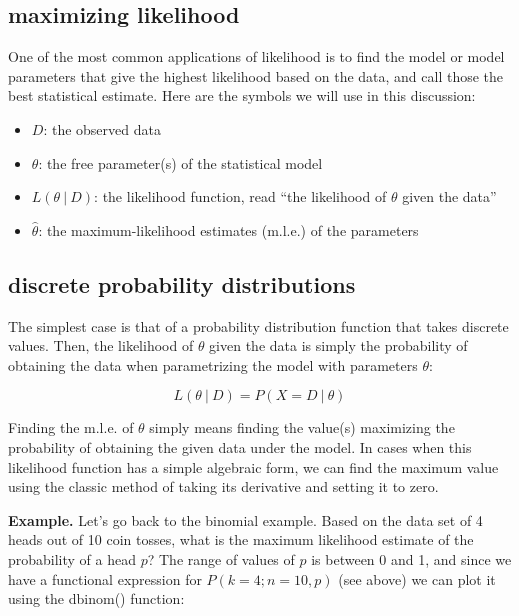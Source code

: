 \documentclass[
  letterpaper,
  DIV=11,
  numbers=noendperiod]{scrreprt}
\providecommand{\tightlist}{%
  \setlength{\itemsep}{0pt}\setlength{\parskip}{0pt}}\usepackage{longtable,booktabs,array}
\begin{document}
\hypertarget{maximizing-likelihood}{%
\subsection{maximizing likelihood}\label{maximizing-likelihood}}

One of the most common applications of likelihood is to find the model
or model parameters that give the highest likelihood based on the data,
and call those the best statistical estimate. Here are the symbols we
will use in this discussion:

\begin{itemize}
\tightlist
\item
  \(D\): the observed data
\item
  \(\theta\): the free parameter(s) of the statistical model
\item
  \(L(\theta \ \vert \ D)\): the likelihood function, read ``the
  likelihood of \(\theta\) given the data''
\item
  \(\hat{\theta}\): the maximum-likelihood estimates (m.l.e.) of the
  parameters
\end{itemize}

\hypertarget{discrete-probability-distributions}{%
\subsection{discrete probability
distributions}\label{discrete-probability-distributions}}

The simplest case is that of a probability distribution function that
takes discrete values. Then, the likelihood of \(\theta\) given the data
is simply the probability of obtaining the data when parametrizing the
model with parameters \(\theta\):

\[L(\theta \ \vert \ D) = P(X = D \ \vert \ \theta)\]

Finding the m.l.e. of \(\theta\) simply means finding the value(s)
maximizing the probability of obtaining the given data under the model.
In cases when this likelihood function has a simple algebraic form, we
can find the maximum value using the classic method of taking its
derivative and setting it to zero.

\textbf{Example.} Let's go back to the binomial example. Based on the
data set of 4 heads out of 10 coin tosses, what is the maximum
likelihood estimate of the probability of a head \(p\)? The range of
values of \(p\) is between 0 and 1, and since we have a functional
expression for \(P(k=4 ; n=10, p)\) (see above) we can plot it using the
dbinom() function:
\end{document}
